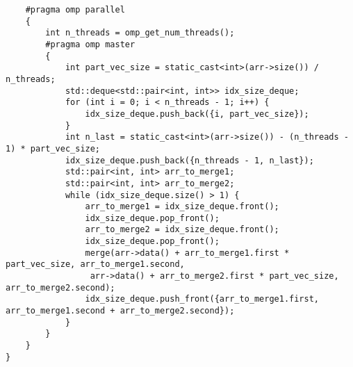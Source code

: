 \documentclass{report}
\begin{document}
\begin{lstlisting}
    #pragma omp parallel
    {
        int n_threads = omp_get_num_threads();
        #pragma omp master
        {
            int part_vec_size = static_cast<int>(arr->size()) / n_threads;
            std::deque<std::pair<int, int>> idx_size_deque;
            for (int i = 0; i < n_threads - 1; i++) {
                idx_size_deque.push_back({i, part_vec_size});
            }
            int n_last = static_cast<int>(arr->size()) - (n_threads - 1) * part_vec_size;
            idx_size_deque.push_back({n_threads - 1, n_last});
            std::pair<int, int> arr_to_merge1;
            std::pair<int, int> arr_to_merge2;
            while (idx_size_deque.size() > 1) {
                arr_to_merge1 = idx_size_deque.front();
                idx_size_deque.pop_front();
                arr_to_merge2 = idx_size_deque.front();
                idx_size_deque.pop_front();
                merge(arr->data() + arr_to_merge1.first * part_vec_size, arr_to_merge1.second,
                 arr->data() + arr_to_merge2.first * part_vec_size, arr_to_merge2.second);
                idx_size_deque.push_front({arr_to_merge1.first, arr_to_merge1.second + arr_to_merge2.second});
            }
        }
    }
}

\end{lstlisting}
\end{document}
